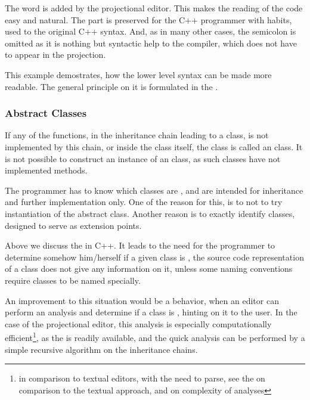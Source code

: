 
The word  is added by the projectional editor. This makes the reading of the code easy and natural.
The  part is preserved for the C++ programmer with habits, used to the original C++ syntax. And, as in many other cases, 
the semicolon is omitted as it is nothing but syntactic help to the compiler, which does not have to appear 
in the projection. 

This example demostrates, how the lower level syntax can be made more readable. The general principle on it is formulated in
the .

\subsubsection{Abstract Classes}
\label{abstractclasses}

If any of the  functions, in the inheritance chain leading to a class, is not implemented by this chain, 
or inside the class itself, the class is called an  class. It is not possible to construct an instance of an
 class, as such classes have not implemented methods.

The programmer has to know which classes are ,
and are intended for inheritance and further implementation only. One of the reason for this, is to not to try instantiation of
the abstract class. Another reason is to exactly identify  classes, designed to serve as extension points.

Above we discuss the  in C++. It leads to the need for the programmer to determine somehow him/herself 
if a given class is , the source code representation of a class does not give any information on it, 
unless some naming conventions require  classes to be named specially.

An improvement to this situation would be a behavior, when an editor can perform an analysis and 
determine if a class is , hinting on it to the user. In the case of the projectional
editor, this analysis is especially computationally efficient\footnote{in comparison to textual editors, with the need to 
parse, see the  on comparison to the textual approach, and  on complexity of analyses}, 
as the  is readily available, and the quick  analysis can be performed by a simple recursive algorithm on the inheritance chains.

